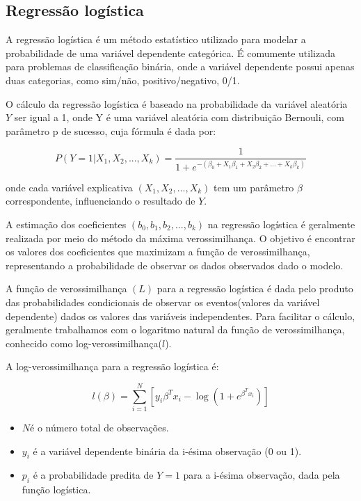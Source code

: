 
 \subsection{Regressão logística}
 A regressão logística é um método estatístico utilizado para modelar a probabilidade de uma variável 
dependente categórica. É comumente utilizada para problemas de classificação binária, onde a variável
dependente possui apenas duas categorias, como sim/não, positivo/negativo, 0/1.


O cálculo da regressão logística é baseado na probabilidade da variável aleatória $Y$ ser igual a 1, onde Y é 
uma variável aleatória com distribuição Bernouli, com parâmetro p de sucesso, cuja fórmula é dada por:

\begin{equation}
  P(Y=1| X_1, X_2, ..., X_k) = \frac{1}{1 + e^{-(\beta_0 + X_{1}\beta_1 + X_{2}\beta_2 + \ldots +X_{k}\beta_k)}}
\end{equation}

\noindent onde cada variável explicativa $(X_1, X_2, ..., X_k)$ tem um parâmetro $\beta$ correspondente, influenciando o resultado de $Y$.

A estimação dos coeficientes $(b_0, b_1, b_2, ..., b_k)$  na regressão logística é geralmente realizada por meio 
do método da máxima verossimilhança. O objetivo é encontrar os valores dos coeficientes que maximizam a função de
verossimilhança, representando a probabilidade de observar os dados observados dado o modelo.
 
A função de verossimilhança $(L)$ para a regressão logística é dada pelo produto das probabilidades condicionais
de observar os eventos(valores da variável dependente) dados os valores das variáveis independentes. Para facilitar o cálculo, 
geralmente trabalhamos com o logaritmo natural da função de verossimilhança, conhecido como log-verossimilhança($l$).

A log-verossimilhança para a regressão logística é:

\begin{equation}
  l(\beta) = \sum_{i=1}^{N} [y_i \beta^T x_i - \log(1 + e^{\beta^T x_i})]
\end{equation}


\begin{itemize}
  \item  $N$é o número total de observações.
  \item  $y_i$ é a variável dependente binária da i-ésima observação (0 ou 1).
  \item $p_i$ é a probabilidade predita de $Y=1$ para a i-ésima observação, dada pela função logística.
\end{itemize}


